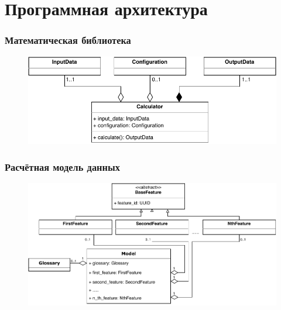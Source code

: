\section{Программная архитектура}

\begin{frame}
\frametitle{Математическая библиотека}
\begin{figure}
    \includegraphics[scale=.8]{pictures/architecture/math_classes}
\end{figure}
\end{frame}

\begin{frame}
\frametitle{Расчётная модель данных}
\begin{figure}
    \includegraphics[scale=.7]{pictures/architecture/model_classes}
\end{figure}
\end{frame}
